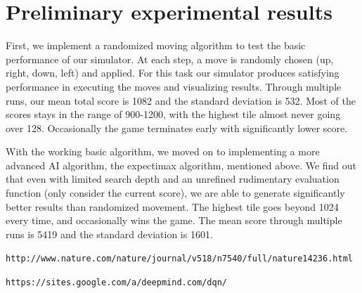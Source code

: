 \documentclass[11pt]{article}
\begin{document}
\section{Preliminary experimental results}

First, we implement a randomized moving algorithm to test the basic performance of our simulator. At each step, a move is randomly chosen (up, right, down, left) and applied. For this task our simulator produces satisfying performance in executing the moves and visualizing results. Through multiple runs, our mean total score is 1082 and the standard deviation is 532. Most of the scores stays in the range of 900-1200, with the highest tile almost never going over 128. Occasionally the game terminates early with significantly lower score.

With the working basic algorithm, we moved on to implementing a more advanced AI algorithm, the expectimax algorithm, mentioned above. We find out that even with limited search depth and an unrefined rudimentary evaluation function (only consider the current score), we are able to generate significantly better results than randomized movement. The highest tile goes beyond 1024 every time, and occasionally wins the game. The mean score through multiple runs is 5419 and the standard deviation is 1601.

\begin{thebibliography}{9}

 \texttt{http://www.nature.com/nature/journal/v518/n7540/full/nature14236.html}

 \texttt{https://sites.google.com/a/deepmind.com/dqn/}

\end{thebibliography}
\end{document}
